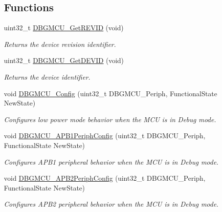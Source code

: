 \subsection*{Functions}
\begin{DoxyCompactItemize}
\item 
uint32\-\_\-t \hyperlink{group___d_b_g_m_c_u_ga47419e9ca75ab7be4c70feb82faa0511}{D\-B\-G\-M\-C\-U\-\_\-\-Get\-R\-E\-V\-I\-D} (void)
\begin{DoxyCompactList}\small\item\em Returns the device revision identifier. \end{DoxyCompactList}\item 
uint32\-\_\-t \hyperlink{group___d_b_g_m_c_u_gac34193c34dbce759bf424957a31b3266}{D\-B\-G\-M\-C\-U\-\_\-\-Get\-D\-E\-V\-I\-D} (void)
\begin{DoxyCompactList}\small\item\em Returns the device identifier. \end{DoxyCompactList}\item 
void \hyperlink{group___d_b_g_m_c_u_gadf2f267f855ac1e4c03905c5dcfbd28b}{D\-B\-G\-M\-C\-U\-\_\-\-Config} (uint32\-\_\-t D\-B\-G\-M\-C\-U\-\_\-\-Periph, Functional\-State New\-State)
\begin{DoxyCompactList}\small\item\em Configures low power mode behavior when the M\-C\-U is in Debug mode. \end{DoxyCompactList}\item 
void \hyperlink{group___d_b_g_m_c_u_ga71349f1435471f71979c742360df88f0}{D\-B\-G\-M\-C\-U\-\_\-\-A\-P\-B1\-Periph\-Config} (uint32\-\_\-t D\-B\-G\-M\-C\-U\-\_\-\-Periph, Functional\-State New\-State)
\begin{DoxyCompactList}\small\item\em Configures A\-P\-B1 peripheral behavior when the M\-C\-U is in Debug mode. \end{DoxyCompactList}\item 
void \hyperlink{group___d_b_g_m_c_u_ga2f5ed438cada1be09ea51c42419be3a8}{D\-B\-G\-M\-C\-U\-\_\-\-A\-P\-B2\-Periph\-Config} (uint32\-\_\-t D\-B\-G\-M\-C\-U\-\_\-\-Periph, Functional\-State New\-State)
\begin{DoxyCompactList}\small\item\em Configures A\-P\-B2 peripheral behavior when the M\-C\-U is in Debug mode. \end{DoxyCompactList}\end{DoxyCompactItemize}


